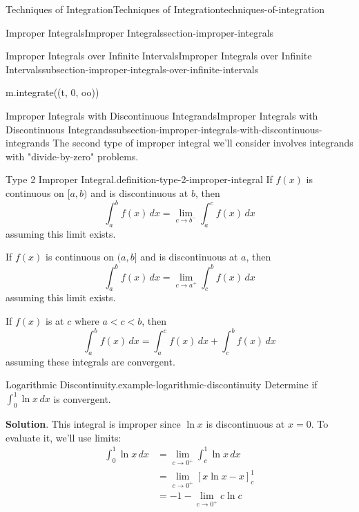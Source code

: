 \documentclass[oneside,10pt,]{book}
\numberwithin{equation}{section}
\newcommand{\lt}{<}
\begin{document}
\begin{chapterptx}{Techniques of Integration}{}{Techniques of Integration}{}{}{techniques-of-integration}
\begin{sectionptx}{Improper Integrals}{}{Improper Integrals}{}{}{section-improper-integrals}
\begin{subsectionptx}{Improper Integrals over Infinite Intervals}{}{Improper Integrals over Infinite Intervals}{}{}{subsection-improper-integrals-over-infinite-intervals}
\begin{sageinput}
m.integrate((t, 0, oo))
\end{sageinput}
\end{subsectionptx}
%
%
\typeout{************************************************}
\typeout{************************************************}
%
\begin{subsectionptx}{Improper Integrals with Discontinuous Integrands}{}{Improper Integrals with Discontinuous Integrands}{}{}{subsection-improper-integrals-with-discontinuous-integrands}
\hypertarget{p-594}{}%
The second type of improper integral we'll consider involves integrands with "divide-by-zero" problems.%
\begin{definition}{Type 2 Improper Integral.}{definition-type-2-improper-integral}%
\hypertarget{p-595}{}%
If \(f(x)\) is continuous on \([a,b)\) and is discontinuous at \(b\), then%
\begin{equation*}
\int_{a}^{b}f(x)\,dx = \lim_{c\to b^{-}}\int_{a}^{c}f(x)\,dx
\end{equation*}
assuming this limit exists.%
\par
\hypertarget{p-596}{}%
If \(f(x)\) is continuous on \((a,b]\) and is discontinuous at \(a\), then%
\begin{equation*}
\int_{a}^{b}f(x)\,dx = \lim_{c\to a^{+}}\int_{c}^{b}f(x)\,dx
\end{equation*}
assuming this limit exists.%
\par
\hypertarget{p-597}{}%
If \(f(x)\) is at \(c\) where \(a \lt c\lt b\), then%
\begin{equation*}
\int_{a}^{b}f(x)\,dx = \int_{a}^{c}f(x)\,dx + \int_{c}^{b}f(x)\,dx
\end{equation*}
assuming these integrals are convergent.%
\end{definition}
\begin{example}{Logarithmic Discontinuity.}{example-logarithmic-discontinuity}%
\hypertarget{p-598}{}%
Determine if \(\int_{0}^{1}\ln x\,dx\) is convergent.%
\par\smallskip%
\noindent\textbf{Solution}.\hypertarget{solution-129}{}\quad%
\hypertarget{p-599}{}%
This integral is improper since \(\ln x\) is discontinuous at \(x = 0\). To evaluate it, we'll use limits:%
\begin{align*}
\int_{0}^{1}\ln x\,dx & = \lim_{c\to0^{+}}\int_{c}^{1}\ln x\,dx \\
& = \lim_{c\to0^{+}}\left[x\ln x - x\right]_{c}^{1} \\
& = -1 - \lim_{c\to0^{+}}c\ln c \\

\end{align*}
\end{example}
\end{subsectionptx}
\end{sectionptx}
\end{chapterptx}
\end{document}

